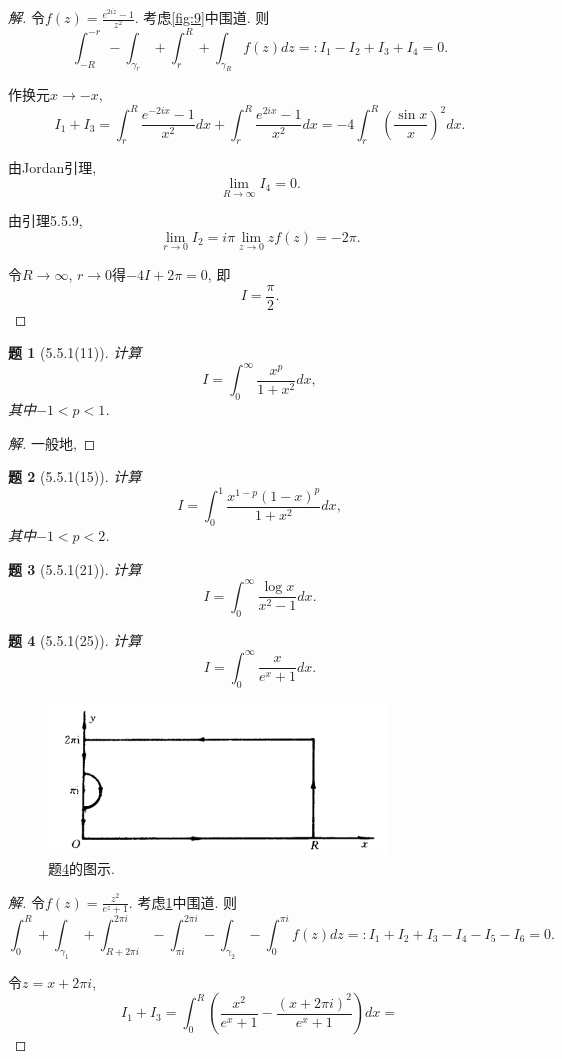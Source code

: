 \documentclass{article}[a4paper, 12pt]
\theoremstyle{mystyle}
\newtheorem{problem}{题}
\newenvironment{solution}{\begin{proof}[解]}{\end{proof}}
\begin{document}
\begin{solution}
  令\(f(z)=\frac{e^{2iz}-1}{z^2}\). 考虑\ref{fig:9}中围道. 则\[\int_{-R}^{-r}-\int_{\gamma_r}+\int_{r}^R+\int_{\gamma_R} f(z)dz=:I_1-I_2+I_3+I_4=0.\]

  作换元\(x\to -x\), \[I_1+I_3=\int_r^R \frac{e^{-2ix}-1}{x^2}dx+\int_r^R \frac{e^{2ix}-1}{x^2}dx=-4\int_r^R \left(\frac{\sin x}{x}\right)^2dx.\]

  由Jordan引理, \[\lim_{R\to\infty} I_4=0.\]

  由引理5.5.9, \[\lim_{r\to0}I_2=i\pi\lim_{z\to0}zf(z)=-2\pi.\]

  令\(R\to\infty\), \(r\to0\)得\(-4I+2\pi=0\), 即\[I=\frac{\pi}{2}.\tag*{\(\qed\)}\]
  \renewcommand{\qedsymbol}{}
\end{solution}

\begin{problem}[5.5.1(11)]
  计算\[I=\int_0^\infty \frac{x^p}{1+x^2}dx,\] 其中\(-1<p<1\).
\end{problem}

\begin{solution}
  一般地, 
\end{solution}

\begin{problem}[5.5.1(15)]
  计算\[I=\int_0^1 \frac{x^{1-p}(1-x)^p}{1+x^2}dx,\] 其中\(-1<p<2\).
\end{problem}

\begin{problem}[5.5.1(21)]
  计算\[I=\int_0^\infty \frac{\log x}{x^2-1}dx.\]
\end{problem}

\begin{problem}[5.5.1(25)] \label{25}
  计算\[I=\int_0^\infty \frac{x}{e^x+1}dx.\]
\end{problem}

\begin{figure}[htbp]
  \centering
  \includegraphics[width=0.8\textwidth]{images/25.png}
  \caption{题\ref{25}的图示.}
  \label{fig:25}
\end{figure}

\begin{solution}
  令\(f(z)=\frac{z^2}{e^z+1}\). 考虑\ref{fig:25}中围道. 则\[\int_{0}^{R}+\int_{\gamma_1}+\int_{R+2\pi i}^{2\pi i}-\int_{\pi i}^{2\pi i}-\int_{\gamma_2}-\int_{0}^{\pi i} f(z)dz=:I_1+I_2+I_3-I_4-I_5-I_6=0.\]

  令\(z=x+2\pi i\), \[I_1+I_3=\int_0^R\left(\frac{x^2}{e^x+1}-\frac{(x+2\pi i)^2}{e^x+1}\right)dx=\]
\end{solution}
\end{document}
